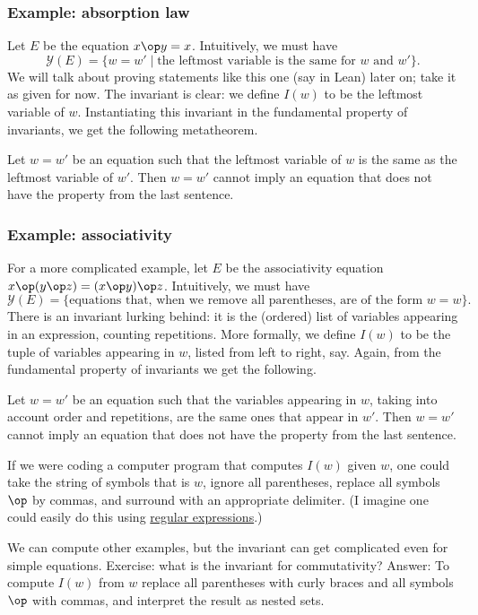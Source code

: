 \subsubsection*{Example: absorption law}
Let $E$ be the equation $x \op y = x$. Intuitively, we must have
\[
\mathcal{Y}(E) = \{w = w' \mid \text{the leftmost variable is the same for $w$ and $w'$}\}.
\]
We will talk about proving statements like this one (say in Lean) later on; take it as given for now. The invariant is clear: we define $I(w)$ to be the leftmost variable of $w$. Instantiating this invariant in the fundamental property of invariants, we get the following metatheorem.
\begin{metatheorem}
	Let $w = w'$ be an equation such that the leftmost variable of $w$ is the same as the leftmost variable of $w'$. Then $w = w'$ cannot imply an equation that does not have the property from the last sentence.
\end{metatheorem}

\subsubsection*{Example: associativity}
For a more complicated example, let $E$ be the associativity equation $x \op (y \op z) = (x \op y) \op z$. Intuitively, we must have
\[
\mathcal{Y}(E) = \{\text{equations that, when we remove all parentheses, are of the form $w = w$}\}.
\]
There is an invariant lurking behind: it is the (ordered) list of variables appearing in an expression, counting repetitions. More formally, we define $I(w)$ to be the tuple of variables appearing in $w$, listed from left to right, say. Again, from the fundamental property of invariants we get the following.
\begin{metatheorem}
	Let $w = w'$ be an equation such that the variables appearing in $w$, taking into account order and repetitions, are the same ones that appear in $w'$. Then $w = w'$ cannot imply an equation that does not have the property from the last sentence.
\end{metatheorem}

If we were coding a computer program that computes $I(w)$ given $w$, one could take the string of symbols that is $w$, ignore all parentheses, replace all symbols $\op$ by commas, and surround with an appropriate delimiter. (I imagine one could easily do this using \href{https://en.wikipedia.org/wiki/Regular_expression}{regular expressions}.)

We can compute other examples, but the invariant can get complicated even for simple equations. Exercise: what is the invariant for commutativity? Answer: To compute $I(w)$ from $w$ replace all parentheses with curly braces and all symbols $\op$ with commas, and interpret the result as nested sets.

